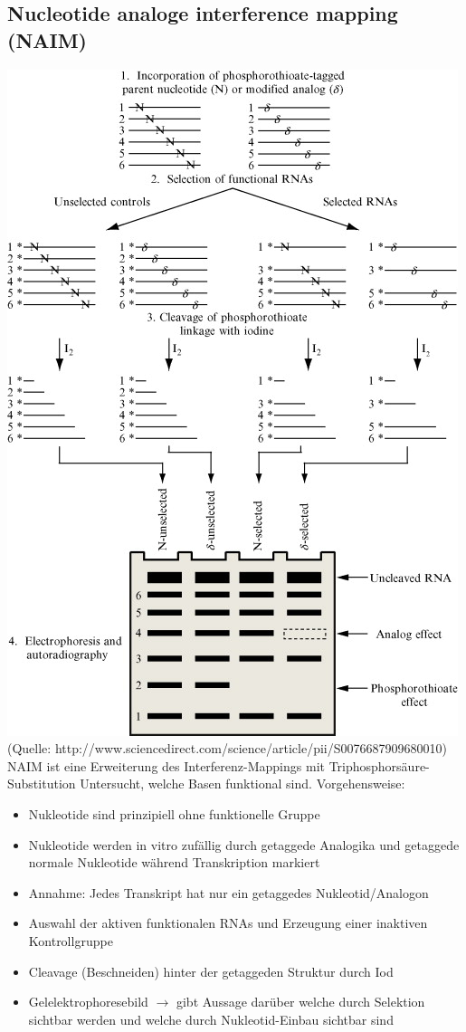 \subsection{Nucleotide analoge interference mapping (NAIM)}
\includegraphics[scale=0.7]{lectures/160527/pix/NAIM.jpg} \\
(Quelle: http://www.sciencedirect.com/science/article/pii/S0076687909680010) \\
 
NAIM ist eine Erweiterung des Interferenz-Mappings mit Triphosphorsäure-Substitution
Untersucht, welche Basen funktional sind. Vorgehensweise:
\begin{itemize}
\item Nukleotide sind prinzipiell ohne funktionelle Gruppe
\item Nukleotide werden in vitro zufällig durch getaggede Analogika und getaggede normale Nukleotide während Transkription markiert
\item Annahme: Jedes Transkript hat nur ein getaggedes Nukleotid/Analogon
\item Auswahl der aktiven funktionalen RNAs und Erzeugung einer inaktiven Kontrollgruppe
\item Cleavage (Beschneiden) hinter der getaggeden Struktur durch Iod
\item Gelelektrophoresebild $\rightarrow$ gibt Aussage darüber welche durch Selektion sichtbar werden und welche durch Nukleotid-Einbau sichtbar sind
\end{itemize}